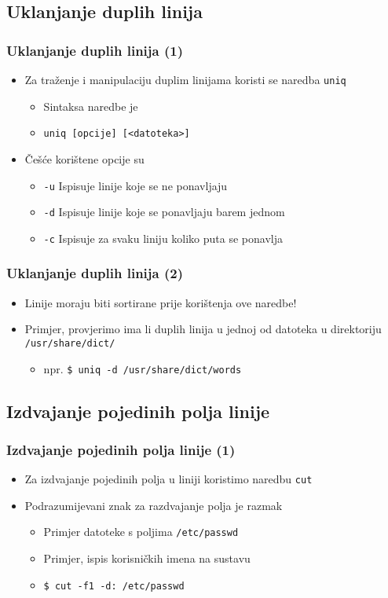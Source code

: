\documentclass{beamer}
\newcommand{\shell}[1]{\texttt{#1}}
\begin{document}
\subsection{Uklanjanje duplih linija}
\begin{frame}[t]
\frametitle{Uklanjanje duplih linija (1)}
\begin{itemize}
  \item Za traženje i manipulaciju duplim linijama koristi se naredba 
        \shell{uniq}
  \begin{itemize}
    \item Sintaksa naredbe je
    \item[] \shell{uniq [opcije] [<datoteka>]}
  \end{itemize}
  \item Češće korištene opcije su
  \begin{itemize}
    \item[] \shell{-u} Ispisuje linije koje se ne ponavljaju  
    \item[] \shell{-d} Ispisuje linije koje se ponavljaju barem jednom
    \item[] \shell{-c} Ispisuje za svaku liniju koliko puta se ponavlja
  \end{itemize}
\end{itemize}
\end{frame}

\begin{frame}[t]
\frametitle{Uklanjanje duplih linija (2)}
\begin{itemize}
  \item Linije moraju biti sortirane prije korištenja ove naredbe!
  \item Primjer, provjerimo ima li duplih linija u jednoj od datoteka u direktoriju
        \shell{/usr/share/dict/}
  \begin{itemize}
    \item[] npr. \shell{\$ uniq -d /usr/share/dict/words}
  \end{itemize}
\end{itemize}
\end{frame}

\subsection{Izdvajanje pojedinih polja linije}
\begin{frame}[t]
\frametitle{Izdvajanje pojedinih polja linije (1)}
\begin{itemize}
  \item Za izdvajanje pojedinih polja u liniji koristimo naredbu 
        \shell{cut}
  \item Podrazumijevani znak za razdvajanje polja je razmak
  \begin{itemize}
    \item Primjer datoteke s poljima \shell{/etc/passwd}
    \item Primjer, ispis korisničkih imena na sustavu
    \item[] \shell{\$ cut -f1 -d: /etc/passwd}
  \end{itemize}
\end{itemize}
\end{frame}
\end{document}
